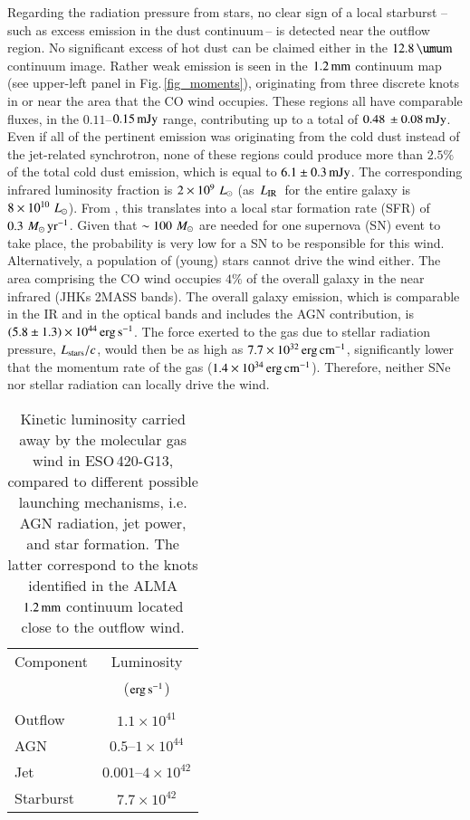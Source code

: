 \documentclass[longauth]{aa}
\newcommand{\msun}{\,\hbox{$M_{\odot}$}}
\newcommand{\lsun}{\,\hbox{$L_{\odot}$}}
\newcommand{\lir}{\,\hbox{$L_{\rm IR}$}}
\def\micron{\hbox{$\umu$m}}
\begin{document}
Regarding the radiation pressure from stars, no clear sign of a local starburst --\,such as excess emission in the dust continuum\,-- is detected near the outflow region. No significant excess of hot dust can be claimed either in the $12.8\, \rm{\micron}$ continuum image. Rather weak emission is seen in the $1.2\, \rm{mm}$ continuum map (see upper-left panel in Fig.\,\ref{fig_moments}), originating from three discrete knots in or near the area that the CO wind occupies. These regions all have comparable fluxes, in the $0.11$--$0.15\, \rm{mJy}$ range, contributing up to a total of $0.48\, \pm 0.08\, \rm{mJy}$. Even if all of the pertinent emission was originating from the cold dust instead of the jet-related synchrotron, none of these regions could produce more than $2.5\%$ of the total cold dust emission, which is equal to $6.1 \pm 0.3\, \rm{mJy}$. The corresponding infrared luminosity fraction is $2 \times 10^9\, \rm{\lsun}$ (as \lir \ for the entire galaxy is $8 \times 10^{10}\, \rm{\lsun}$). From , this translates into a local star formation rate (SFR) of $0.3\, \rm{\msun\,yr^{-1}}$. Given that $\sim 100\, \rm{\msun}$ are needed for one supernova (SN) event to take place, the probability is very low for a SN to be responsible for this wind. Alternatively, a population of (young) stars cannot drive the wind either. The area comprising the CO wind occupies $4\%$ of the overall galaxy in the near infrared (JHKs 2MASS bands). The overall galaxy emission, which is comparable in the IR and in the optical bands and includes the AGN contribution, is $(5.8 \pm 1.3) \times 10^{44}\, \rm{erg\,s^{-1}}$. The force exerted to the gas due to stellar radiation pressure, $L_{\rm stars}/c$, would then be as high as $7.7 \times 10^{32}\, \rm{erg\,cm^{-1}}$, significantly lower that the momentum rate of the gas ($1.4 \times 10^{34}\, \rm{erg\,cm^{-1}}$). Therefore, neither SNe nor stellar radiation can locally drive the wind.
\begin{table}
\caption{Kinetic luminosity carried away by the molecular gas wind in ESO\,420-G13, compared to different possible launching mechanisms, i.e. AGN radiation, jet power, and star formation. The latter correspond to the knots identified in the ALMA $1.2\, \rm{mm}$ continuum located close to the outflow wind.}\label{tab_en}
\centering
\begin{tabular}{lc}
  Component  & Luminosity \\& ($\rm{erg\,s^{-1}}$) \\\hline \\[-0.3cm]
  Outflow    & $1.1 \times 10^{41}$ \\AGN        & $0.5$--$1 \times 10^{44}$ \\Jet        & $0.001$--$4 \times 10^{42}$ \\Starburst  & $7.7 \times 10^{42}$ \\\hline
\end{tabular}
\end{table}
\end{document}
